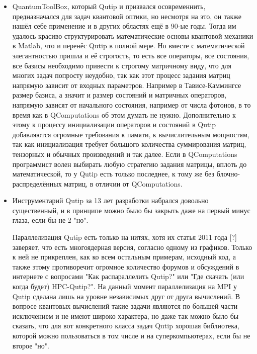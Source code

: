 \documentclass[aps,twocolumn,pra,showpacs,amsmath,amssymb,showkeys,10pt]{revtex4-2}
\begin{document}
    \begin{itemize}
    \item QuantumToolBox, который Qutip и призвался осовременнить, предназначался для задач квантовой оптики, но несмотря на это, он также нашёл себе применение и в других областях ещё в 90-ые годы. 
    Тогда им удалось красиво структурировать математические основы квантовой механики в Matlab, что и перенёс Qutip в полной мере. Но вместе с математической элегантностью пришла и её строгость, то 
    есть все операторы, все состояния, все базисы необходимо привести к строгому матричному виду, что для многих задач попросту неудобно, так как этот процесс задания матриц напрямую зависит от 
    входных параметров. Например в Тависе-Каммингсе размер базиса, а значит и размер состояний и матричных операторов, напрямую зависят от начального состояния, например от числа фотонов, в то время 
    как в QComputations об этом думать не нужно. Дополнительно к этому к процессу инициализации операторов и состояний в Qutip добавляются огромные требования к памяти, к вычислительным мощностям, так как 
    инициализация требует большого количества суммирования матриц, тензорных и обычных произведений и так далее. Если в QComputations программист волен выбирать любую стратегию задания матрицы, вплоть 
    до математической, то у Qutip есть только последнее, к тому же без блочно-распределённых матриц, в отличии от QComputations.

    \item{Инструментарий Qutip за 13 лет разработки набрался довольно существенный, и в принципе можно было бы закрыть даже на первый минус глаза, если бы не 2 "но". 
    
    Параллелизация Qutip 
    есть только на нитях, хотя их статья 2011 года [?] заверяет, что есть многоядерная версия, согласно одному из графиков. Только к ней не прикреплен, как ко всем остальным примерам, исходный код, а 
    также этому противоречит огромное количество форумов и обсуждений в интернете с вопросами "Как распараллелить Qutip?" или "Где скачать (или когда будет) HPC-Qutip?". На данный момент параллелизация 
    на MPI у Qutip сделана лишь на уровне независимых друг от друга вычислений. В вопросе квантовых вычислений такие задачи являются по большей части исключением и не имеют широко характера, но даже так 
    можно было бы сказать, что для вот конкретного класса задач Qutip хорошая библиотека, которой можно пользоваться в том числе и на суперкомпьютерах, если бы не второе "но".

}
\end{itemize}
\end{document}
